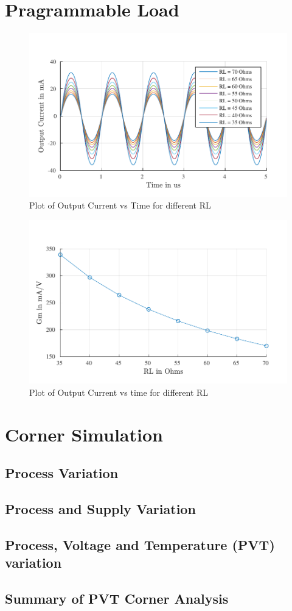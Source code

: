 \section{Pragrammable Load}

\begin{figure} [H]
\centering
\includegraphics[scale=1]{Figures/Plots/Ov_Sine_RL.pdf}
\caption{Plot of Output Current vs Time for different RL}
\end{figure}

\begin{figure} [H]
\centering
\includegraphics[scale=1]{Figures/Plots/Ov_Gm_RL.pdf}
\caption{Plot of Output Current vs time for different RL}
\end{figure}

\section{Corner Simulation}
\subsection{Process Variation}
\subsection{Process and Supply Variation}
\subsection{Process, Voltage and Temperature (PVT) variation}
\subsection{Summary of PVT Corner Analysis}